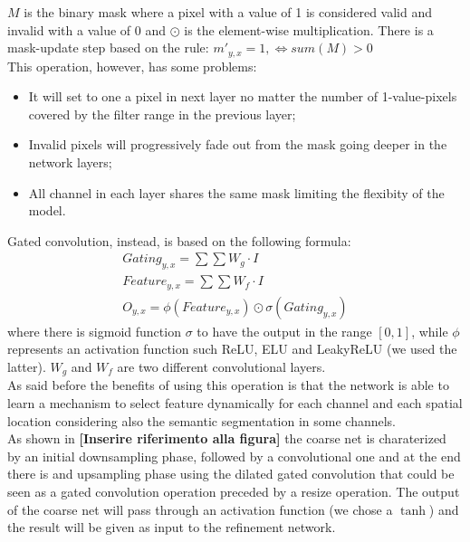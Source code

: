 \documentclass[10pt,twocolumn,letterpaper]{article}
\begin{document}
\(M\) is the binary mask where a pixel with a value of 1 is considered valid and
invalid with a value of 0 and \(\odot\) is the element-wise multiplication.
There is a mask-update step based on the rule: \(m'_{y,x} = 1, \iff sum(M) > 0\)
\\
This operation, however, has some problems:
\begin{itemize}
    \item It will set to one a pixel in next layer no matter the number of
      1-value-pixels covered by the filter range in the previous layer;
    \item Invalid pixels will progressively fade out from the mask going deeper
      in the network layers;
    \item All channel in each layer shares the same mask limiting the flexibity
      of the model.
\end{itemize}
Gated convolution, instead, is based on the following formula:
\begin{gather}
    Gating_{y,x} = \sum \sum W_g \cdot I \\
    Feature_{y,x} = \sum \sum W_f \cdot I \\
    O_{y,x} = \phi (Feature_{y,x}) \odot \sigma (Gating_{y,x})
\end{gather}
where there is sigmoid function \(\sigma\) to have the output in the range
\([0,1]\), while \(\phi\) represents an activation function such ReLU, ELU and
LeakyReLU (we used the latter). \(W_g\) and \(W_f\) are two different
convolutional layers.
\\
As said before the benefits of using this operation is that the network is able
to learn a mechanism to select feature dynamically for each channel and each
spatial location considering also the semantic segmentation in some channels.
\\
As shown in \textbf{[Inserire riferimento alla figura]} the coarse net is
charaterized by an initial downsampling phase, followed by a convolutional one
and at the end there is and upsampling phase using the dilated gated convolution
that could be seen as a gated convolution operation preceded by a resize
operation. The output of the coarse net will pass through an activation function
(we chose a \(\tanh\)) and the result will be given as input to the refinement
network.
\end{document}
